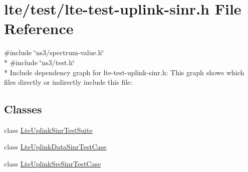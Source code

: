 \hypertarget{lte-test-uplink-sinr_8h}{}\section{lte/test/lte-\/test-\/uplink-\/sinr.h File Reference}
\label{lte-test-uplink-sinr_8h}
{\ttfamily \#include \char`\"{}ns3/spectrum-\/value.\+h\char`\"{}}\\*
{\ttfamily \#include \char`\"{}ns3/test.\+h\char`\"{}}\\*
Include dependency graph for lte-\/test-\/uplink-\/sinr.h\+:
This graph shows which files directly or indirectly include this file\+:
\subsection*{Classes}
\begin{DoxyCompactItemize}
\item 
class \hyperlink{classLteUplinkSinrTestSuite}{Lte\+Uplink\+Sinr\+Test\+Suite}
\item 
class \hyperlink{classLteUplinkDataSinrTestCase}{Lte\+Uplink\+Data\+Sinr\+Test\+Case}
\item 
class \hyperlink{classLteUplinkSrsSinrTestCase}{Lte\+Uplink\+Srs\+Sinr\+Test\+Case}
\end{DoxyCompactItemize}
